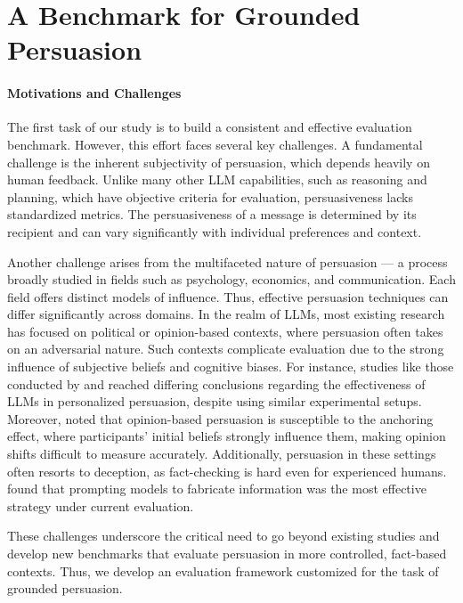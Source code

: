 \section{A Benchmark for Grounded Persuasion}

\paragraph{Motivations and Challenges}
The first task of our study is to build a consistent and effective evaluation benchmark. However, this effort faces several key challenges. A fundamental challenge is the inherent subjectivity of persuasion, which depends heavily on human feedback. Unlike many other LLM capabilities, such as reasoning and planning, 
which have objective criteria for evaluation, persuasiveness lacks standardized metrics. The persuasiveness of a message is determined by its recipient and can vary significantly with individual preferences and context.  

Another challenge arises from the multifaceted nature of persuasion --- a process broadly studied in fields such as psychology, economics, and communication.  Each field offers distinct models of influence. 
Thus, effective persuasion techniques can differ significantly across domains. In the realm of LLMs, most existing research has focused on political or opinion-based contexts, where persuasion often takes on an adversarial nature. Such contexts complicate evaluation due to the strong influence of subjective beliefs and cognitive biases. For instance, studies like those conducted by \citet{hackenburg2024evaluating} and \citet{matz2024potential} reached differing conclusions regarding the effectiveness of LLMs in personalized persuasion, despite using similar experimental setups. 
Moreover, \citet{durmus2024measuring} noted that opinion-based persuasion is susceptible to the anchoring effect, where participants' initial beliefs strongly influence them, making opinion shifts difficult to measure accurately.
Additionally, persuasion in these settings often resorts to deception, as fact-checking is hard even for experienced humans. \citet{durmus2024measuring} found that prompting models to fabricate information was the most effective strategy under current evaluation. 

These challenges underscore the critical need to go beyond existing studies and develop new benchmarks that evaluate persuasion in more controlled, fact-based contexts.
Thus, we develop an evaluation framework customized for the task of grounded persuasion. 

